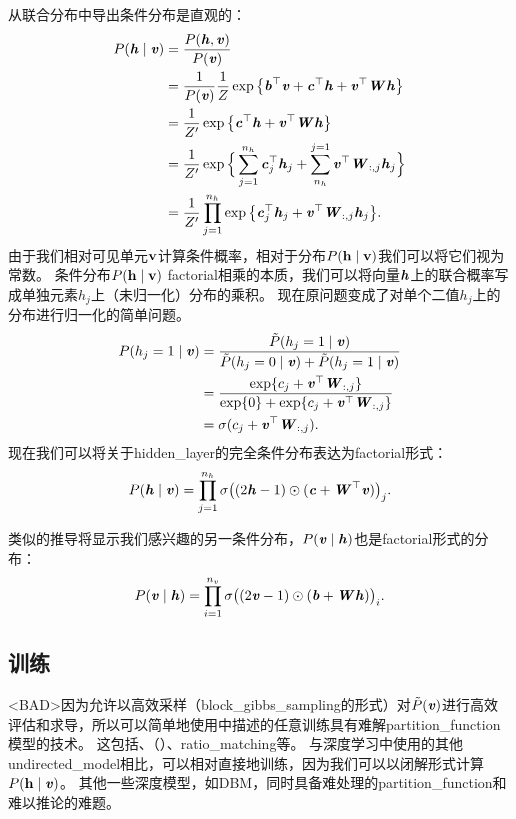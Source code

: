 从联合分布中导出条件分布是直观的：
\begin{align}
 P(\Vh \mid \Vv) &= \frac{P(\Vh, \Vv)}{P(\Vv)} \\
 &= \frac{1}{P(\Vv)} \frac{1}{Z} \exp \big\{ \Vb^\top \Vv + \Vc^\top \Vh + \Vv^\top\MW \Vh \big\} \\
 &=  \frac{1}{Z^\prime} \exp \big\{ \Vc^\top \Vh + \Vv^\top\MW \Vh \big\} \\
 &=  \frac{1}{Z^\prime} \exp \Big\{ \sum_{j=1}^{n_h}\Vc_j^\top \Vh_j 
 + \sum_{n_h}^{j=1} \Vv^\top\MW_{:,j} \Vh_j \Big\} \\
 &=  \frac{1}{Z^\prime} \prod_{j=1}^{n_h} \exp \big\{ \Vc_j^\top \Vh_j + \Vv^\top\MW_{:,j} \Vh_j \big\} .
\end{align}
由于我们相对可见单元$\RVv$计算条件概率，相对于分布$P(\RVh  \mid  \RVv)$我们可以将它们视为常数。
条件分布$ P(\RVh  \mid  \RVv) $ \gls{factorial}相乘的本质，我们可以将向量$\Vh$上的联合概率写成单独元素$h_j$上（未归一化）分布的乘积。
现在原问题变成了对单个二值$h_j$上的分布进行归一化的简单问题。
\begin{align}
 P(h_j=1  \mid  \Vv) &= \frac{\tilde{P}(h_j=1 \mid \Vv)}{\tilde{P}(h_j=0 \mid \Vv) + \tilde{P}(h_j=1 \mid \Vv)} \\
 &= \frac{\exp \{ c_j + \Vv^\top \MW_{:,j} \} }{\exp\{ 0 \} + \exp \{ c_j + \Vv^\top \MW_{:,j}\}} \\
 &= \sigma (c_j + \Vv^\top \MW_{:,j}).
\end{align}
现在我们可以将关于\gls{hidden_layer}的完全条件分布表达为\gls{factorial}形式：
\begin{align}
 P(\Vh  \mid  \Vv) = \prod_{j=1}^{n_h} \sigma \big( (2\Vh-1) \odot (\Vc + \MW^\top \Vv) \big)_j .
\end{align}

类似的推导将显示我们感兴趣的另一条件分布，$P(\Vv  \mid  \Vh)$也是\gls{factorial}形式的分布：
\begin{align}
  P(\Vv  \mid  \Vh) = \prod_{i=1}^{n_v} \sigma \big( (2\Vv-1) \odot (\Vb + \MW \Vh) \big)_i .
\end{align}


\subsection{训练}
\label{sec:training_restricted_boltzmann_machines}

<BAD>因为允许以高效采样（\gls{block_gibbs_sampling}的形式）对$\tilde{P}(\Vv)$进行高效评估和求导，所以可以简单地使用中描述的任意训练具有难解\gls{partition_function}模型的技术。
这包括、（）、\gls{ratio_matching}等。
与深度学习中使用的其他\gls{undirected_model}相比，可以相对直接地训练，因为我们可以以闭解形式计算$P(\RVh  \mid  \Vv)$。
其他一些深度模型，如\gls{DBM}，同时具备难处理的\gls{partition_function}和难以推论的难题。

